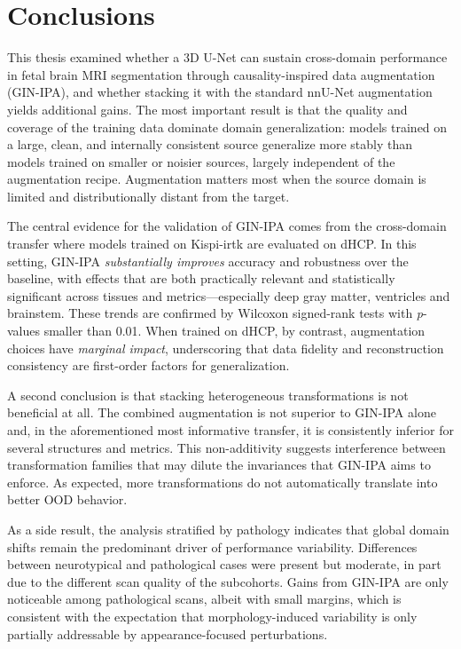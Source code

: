 
\chapter*{Conclusions}
\vspace{1cm}

This thesis examined whether a 3D U-Net can sustain cross-domain performance in fetal brain MRI segmentation through causality-inspired data augmentation (GIN-IPA), and whether stacking it with the standard nnU-Net augmentation yields additional gains. The most important result is that the quality and coverage of the training data dominate domain generalization: models trained on a large, clean, and internally consistent source generalize more stably than models trained on smaller or noisier sources, largely independent of the augmentation recipe. Augmentation matters most when the source domain is limited and distributionally distant from the target.

The central evidence for the validation of GIN-IPA comes from the cross-domain transfer where models trained on Kispi-irtk are evaluated on dHCP. In this setting, GIN-IPA \emph{substantially improves} accuracy and robustness over the baseline, with effects that are both practically relevant and statistically significant across tissues and metrics---especially deep gray matter, ventricles and brainstem. These trends are confirmed by Wilcoxon signed-rank tests with \textit{p}-values smaller than \num{0.01}. When trained on dHCP, by contrast, augmentation choices have \emph{marginal impact}, underscoring that data fidelity and reconstruction consistency are first-order factors for generalization.

A second conclusion is that stacking heterogeneous transformations is not beneficial at all. The combined augmentation is not superior to GIN-IPA alone and, in the aforementioned most informative transfer, it is consistently inferior for several structures and metrics. This non-additivity suggests interference between transformation families that may dilute the invariances that GIN-IPA aims to enforce. As expected, more transformations do not automatically translate into better OOD behavior.

As a side result, the analysis stratified by pathology indicates that global domain shifts remain the predominant driver of performance variability. Differences between neurotypical and pathological cases were present but moderate, in part due to the different scan quality of the subcohorts. Gains from GIN-IPA are only noticeable among pathological scans, albeit with small margins, which is consistent with the expectation that morphology-induced variability is only partially addressable by appearance-focused perturbations.

